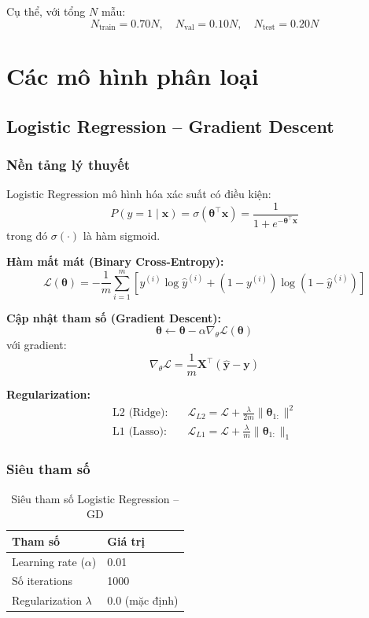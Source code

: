 \documentclass[12pt, a4paper]{article}
\begin{document}
Cụ thể, với tổng $N$ mẫu:
$$N_{\text{train}} = 0.70N, \quad N_{\text{val}} = 0.10N, \quad N_{\text{test}} = 0.20N$$

\section{Các mô hình phân loại}
\label{sec:models}

\subsection{Logistic Regression -- Gradient Descent}
\label{ssec:lr_gd}

\subsubsection{Nền tảng lý thuyết}

Logistic Regression mô hình hóa xác suất có điều kiện:
$$P(y=1 \mid \mathbf{x}) = \sigma(\mathbf{\theta}^\top \mathbf{x}) = \frac{1}{1 + e^{-\mathbf{\theta}^\top \mathbf{x}}}$$
trong đó $\sigma(\cdot)$ là hàm sigmoid.

\textbf{Hàm mất mát (Binary Cross-Entropy):}
$$\mathcal{L}(\mathbf{\theta}) = -\frac{1}{m}\sum_{i=1}^{m} \left[y^{(i)}\log \hat{y}^{(i)} + (1-y^{(i)})\log(1-\hat{y}^{(i)})\right]$$

\textbf{Cập nhật tham số (Gradient Descent):}
$$\mathbf{\theta} \leftarrow \mathbf{\theta} - \alpha \nabla_\theta \mathcal{L}(\mathbf{\theta})$$
với gradient:
$$\nabla_\theta \mathcal{L} = \frac{1}{m} \mathbf{X}^\top (\hat{\mathbf{y}} - \mathbf{y})$$

\textbf{Regularization:}
\begin{align*}
  \text{L2 (Ridge):} \quad & \mathcal{L}_{L2} = \mathcal{L} + \frac{\lambda}{2m}\|\mathbf{\theta}_{1:}\|^2 \\
  \text{L1 (Lasso):} \quad & \mathcal{L}_{L1} = \mathcal{L} + \frac{\lambda}{m}\|\mathbf{\theta}_{1:}\|_1
\end{align*}

\subsubsection{Siêu tham số}
\begin{table}[H]
  \centering
  \caption{Siêu tham số Logistic Regression -- GD}
  \begin{tabular}{ll}
    \toprule
    \textbf{Tham số} & \textbf{Giá trị} \\
    \midrule
    Learning rate ($\alpha$) & 0.01 \\
    Số iterations & 1000 \\
    Regularization $\lambda$ & 0.0 (mặc định) \\
    \bottomrule
  \end{tabular}
\end{table}
\end{document}
